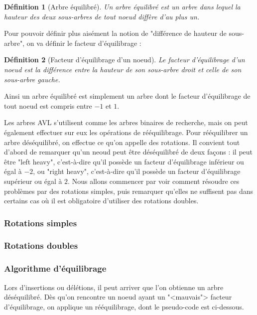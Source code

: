 \documentclass{article}
\newtheorem*{ddef}{Définition}
\begin{document}
\begin{ddef}[Arbre équilibré]
Un arbre équilibré est un arbre dans lequel la hauteur des deux sous-arbres de tout noeud diffère d'au plus un.
\end{ddef}

Pour pouvoir définir plus aisément la notion de "différence de hauteur de sous-arbre", on va définir le facteur d'équilibrage :

\begin{ddef}[Facteur d'équilibrage d'un noeud]
Le facteur d'équilibrage d'un noeud est la différence entre la hauteur de son sous-arbre droit et celle de son sous-arbre gauche.
\end{ddef}

Ainsi un arbre équilibré est simplement un arbre dont le facteur d'équilibrage de tout noeud est compris entre $-1$ et $1$.

Les arbres AVL s'utilisent comme les arbres binaires de recherche, mais on peut également effectuer sur eux les opérations de rééquilibrage. Pour rééquilibrer 
un arbre déséquilibré, on effectue ce qu'on appelle des rotations. Il convient tout d'abord de remarquer qu'un neoud peut être déséquilibré de deux façons : il peut 
être "left heavy", c'est-à-dire qu'il possède un facteur d'équilibrage inférieur ou égal à $-2$, ou "right heavy", c'est-à-dire qu'il possède un facteur 
d'équilibrage supérieur ou égal à $2$. Nous allons commencer par voir comment résoudre ces problèmes par des rotations simples, puis remarquer qu'elles ne suffisent pas 
dans certains cas où il est obligatoire d'utiliser des rotations doubles.

\subsubsection{Rotations simples}


\subsubsection{Rotations doubles}

\subsubsection{Algorithme d'équilibrage}
Lors d'insertions ou délétions, il peut arriver que l'on obtienne un arbre déséquilibré. Dès qu'on rencontre un noeud ayant un "<mauvais"> facteur d'équilibrage,
on applique un rééquilibrage, dont le pseudo-code est ci-dessous.
\end{document}

